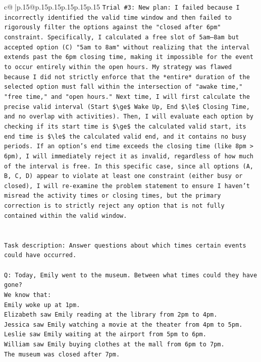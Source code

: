 \documentclass{article}
\begin{document}
{\begin{supertabular}{c@{$\;$}|p{.15\linewidth}@{}p{.15\linewidth}p{.15\linewidth}p{.15\linewidth}p{.15\linewidth}p{.15\linewidth}}
{{{\texttt{Trial \#3: New plan: I failed because I incorrectly identified the valid time window and then failed to rigorously filter the options against the "closed after 6pm" constraint. Specifically, I calculated a free slot of 5am–8am but accepted option (C) "5am to 8am" without realizing that the interval extends past the 6pm closing time, making it impossible for the event to occur entirely within the open hours. My strategy was flawed because I did not strictly enforce that the *entire* duration of the selected option must fall within the intersection of "awake time," "free time," and "open hours." Next time, I will first calculate the precise valid interval (Start \$\textbackslash{}ge\$ Wake Up, End \$\textbackslash{}le\$ Closing Time, and no overlap with activities). Then, I will evaluate each option by checking if its start time is \$\textbackslash{}ge\$ the calculated valid start, its end time is \$\textbackslash{}le\$ the calculated valid end, and it contains no busy periods. If an option's end time exceeds the closing time (like 8pm > 6pm), I will immediately reject it as invalid, regardless of how much of the interval is free. In this specific case, since all options (A, B, C, D) appear to violate at least one constraint (either busy or closed), I will re{-}examine the problem statement to ensure I haven't misread the activity times or closing times, but the primary correction is to strictly reject any option that is not fully contained within the valid window.} \\
\\ 
\\ 
\texttt{Task description: Answer questions about which times certain events could have occurred.} \\
\\ 
\texttt{Q: Today, Emily went to the museum. Between what times could they have gone?} \\
\texttt{We know that:} \\
\texttt{Emily woke up at 1pm.} \\
\texttt{Elizabeth saw Emily reading at the library from 2pm to 4pm.} \\
\texttt{Jessica saw Emily watching a movie at the theater from 4pm to 5pm.} \\
\texttt{Leslie saw Emily waiting at the airport from 5pm to 6pm.} \\
\texttt{William saw Emily buying clothes at the mall from 6pm to 7pm.} \\
\texttt{The museum was closed after 7pm.} \\
}}}
\end{supertabular}}
\end{document}
